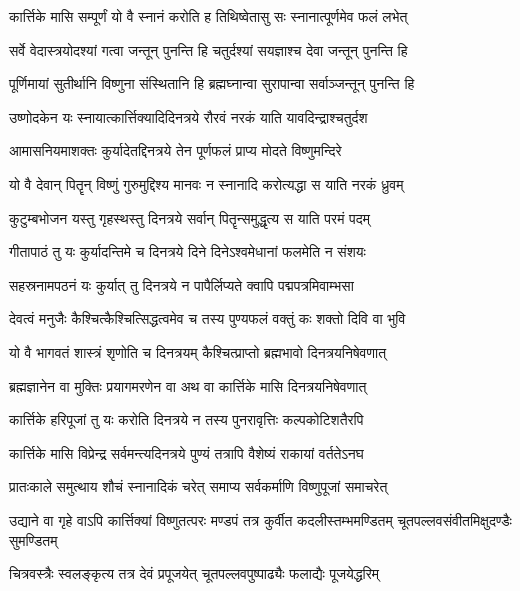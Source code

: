 \twolineshloka
{कार्त्तिके मासि सम्पूर्णं यो वै स्नानं करोति ह} %
{तिथिष्वेतासु सः स्नानात्पूर्णमेव फलं लभेत्}

\twolineshloka
{सर्वे वेदास्त्रयोदश्यां गत्वा जन्तून् पुनन्ति हि} %
{चतुर्दश्यां सयज्ञाश्च देवा जन्तून् पुनन्ति हि}

\twolineshloka
{पूर्णिमायां सुतीर्थानि विष्णुना संस्थितानि हि} %
{ब्रह्मघ्नान्वा सुरापान्वा सर्वाञ्जन्तून् पुनन्ति हि}

\twolineshloka
{उष्णोदकेन यः स्नायात्कार्त्तिक्यादिदिनत्रये} %
{रौरवं नरकं याति यावदिन्द्राश्चतुर्दश}

\twolineshloka
{आमासनियमाशक्तः कुर्यादेतद्दिनत्रये} %
{तेन पूर्णफलं प्राप्य मोदते विष्णुमन्दिरे}

\twolineshloka
{यो वै देवान् पितॄन् विष्णुं गुरुमुद्दिश्य मानवः} %
{न स्नानादि करोत्यद्धा स याति नरकं ध्रुवम्}

\twolineshloka
{कुटुम्बभोजन यस्तु गृहस्थस्तु दिनत्रये} %
{सर्वान् पितॄन्समुद्धृत्य स याति परमं पदम्}

\twolineshloka
{गीतापाठं तु यः कुर्यादन्तिमे च दिनत्रये} %
{दिने दिनेऽश्वमेधानां फलमेति न संशयः}

\twolineshloka
{सहस्रनामपठनं यः कुर्यात् तु दिनत्रये} %
{न पापैर्लिप्यते क्वापि पद्मपत्रमिवाम्भसा}

\twolineshloka
{देवत्वं मनुजैः कैश्चित्कैश्चित्सिद्धत्वमेव च} %
{तस्य पुण्यफलं वक्तुं कः शक्तो दिवि वा भुवि}

\twolineshloka
{यो वै भागवतं शास्त्रं शृणोति च दिनत्रयम्} %
{कैश्चित्प्राप्तो ब्रह्मभावो दिनत्रयनिषेवणात्}

\twolineshloka
{ब्रह्मज्ञानेन वा मुक्तिः प्रयागमरणेन वा} %
{अथ वा कार्त्तिके मासि दिनत्रयनिषेवणात्}

\twolineshloka
{कार्त्तिके हरिपूजां तु यः करोति दिनत्रये} %
{न तस्य पुनरावृत्तिः कल्पकोटिशतैरपि}

\twolineshloka
{कार्त्तिके मासि विप्रेन्द्र सर्वमन्त्यदिनत्रये} %
{पुण्यं तत्रापि वैशेष्यं राकायां वर्ततेऽनघ}

\twolineshloka
{प्रातःकाले समुत्थाय शौचं स्नानादिकं चरेत्} %
{समाप्य सर्वकर्माणि विष्णुपूजां समाचरेत्}

\threelineshloka
{उद्याने वा गृहे वाऽपि कार्त्तिक्यां विष्णुतत्परः} %
{मण्डपं तत्र कुर्वीत कदलीस्तम्भमण्डितम्}
{चूतपल्लवसंवीतमिक्षुदण्डैः सुमण्डितम्} %


\twolineshloka
{चित्रवस्त्रैः स्वलङ्कृत्य तत्र देवं प्रपूजयेत्}
{चूतपल्लवपुष्पाढ्यैः फलाद्यैः पूजयेद्धरिम्} %

